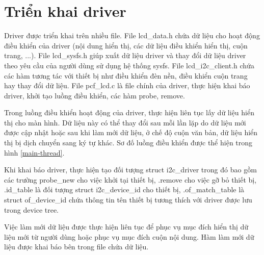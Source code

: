 \documentclass{report}
\begin{document}
\section{Triển khai driver}
Driver được triển khai trên nhiều file. File lcd\_data.h chứa dữ liệu cho hoạt động điều khiển của driver (nội dung hiển thị, các dữ liệu điều khiển hiển thị, cuộn trang, ...).  File lcd\_sysfs.h giúp xuất dữ liệu driver và thay đổi dữ liệu driver theo yêu cầu của người dùng sử dụng hệ thống sysfs. File lcd\_i2c\_client.h chứa các hàm tương tác với thiết bị như điều khiển đèn nền, điều khiển cuộn trang hay thay đổi dữ liệu. File pcf\_lcd.c là file chính của driver, thực hiện khai báo driver, khởi tạo luồng điều khiển, các hàm probe, remove.

Trong luồng điều khiển hoạt động của driver, thực hiện liên tục lấy dữ liệu hiển thị cho màn hình. Dữ liệu này có thể thay đổi sau mỗi lần lặp do dữ liệu mới được cập nhật hoặc sau khi làm mới dữ liệu, ở chế độ cuộn văn bản, dữ liệu hiển thị bị dịch chuyển sang ký tự khác. Sơ đố luồng điều khiển được thể hiện trong hình \ref{main-thread}.

Khi khai báo driver, thực hiện tạo đối tượng struct i2c\_driver trong đó bao gồm các trường probe\_new cho việc khởi tại thiết bị, .remove cho việc 	gỡ bỏ thiết bị, .id\_table là đối tượng struct i2c\_device\_id cho thiết bị, .of\_match\_table là struct of\_device\_id chứa thông tin tên thiết bị tương thích với driver được lưu trong device tree.


Việc làm mới dữ liệu được thực hiện liên tục để phục vụ mục đích hiển thị dữ liệu mới từ người dùng hoặc phục vụ mục đích cuộn nội dung. Hàm làm mới dữ liệu được khai báo bên trong file chứa dữ liệu.


\end{document}
